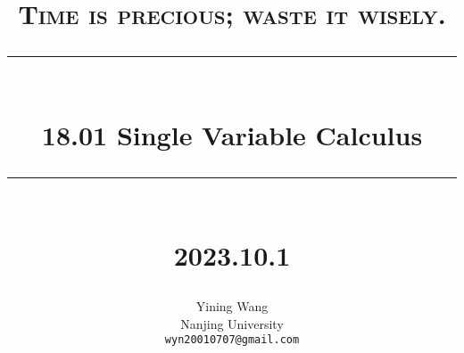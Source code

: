 \newcommand{\HRule}[1]{\rule{\linewidth}{#1}} 	%

\makeatletter							%
\def\printtitle{%
    {\centering \@title\par}}
\makeatother									

\makeatletter							%
\def\printauthor{%
    {\centering \large \@author}}				
\makeatother							

\title{	\normalsize \textsc{Time is precious; waste it wisely.} 	%
		 	\\[2.0cm]								%
			\HRule{0.5pt} \\						%
			\LARGE \textbf{18.01 Single Variable Calculus}	%
			\HRule{2pt} \\ [0.5cm]		%
			\normalsize 2023.10.1			%
		}

\author{
    Yining Wang\\	
    Nanjing University\\	
    \texttt{wyn20010707@gmail.com} \\
}

\thispagestyle{empty}		%

\printtitle					%
  	\vfill
\printauthor				%
\newpage






